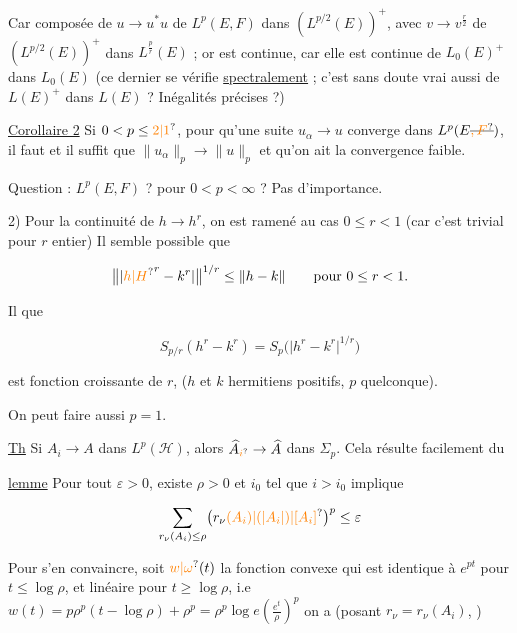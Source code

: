Car composée de $u\to u^*u$ de $L^p(E,F)$ dans $(L^{p/2}(E))^+$, avec $v\to v^{\frac r2}$ de $(L^{p/2}(E))^+$ dans $L^{\frac pr}(E)$ ; or   est continue, car elle est continue de $L_0(E)^+$ dans $L_0(E)$ (ce dernier  se vérifie \uline{spectralement} ; c'est sans doute vrai aussi de $L(E)^+$ dans $L(E)$ ? Inégalités précises ?)

\uline{Corollaire 2} Si $0<p\leq\unsure{2|1}$, pour qu'une suite  $u_\alpha\to u$ converge dans $L^p(E\deleted{\unsure{,F}})$, il faut et il suffit que $\|u_\alpha\|_p\to\|u\|_p$ et qu'on ait la convergence faible.

Question :    $L^p(E,F)$ ? pour $0<p<\infty$ ? Pas d'importance.

2) Pour la continuité de $h\to h^r$, on est ramené au cas $0\leq r<1$ (car c'est trivial pour $r$ entier) Il semble possible que

\[
\bigl\|\lvert {\unsure{h|H}}^r-k^r\rvert\bigr\|^{1/r}\leq\|h-k\|\qquad\text{pour }0\leq r<1.
\]

Il  que

\[
S_{p/r}(h^r-k^r)=S_p\bigl(\lvert h^r-k^r\rvert^{1/r}\bigr)
\]

est fonction croissante de $r$, ($h$ et $k$ hermitiens positifs, $p$ quelconque).

On peut faire aussi $p=1$.

\uline{Th} Si $A_i\to A$ dans $L^p(\mathscr H)$, alors $\widehat A_{\unsure{i}}\to\widehat A$ dans $\Sigma_p$. Cela résulte facilement du

\uline{lemme} Pour tout $\varepsilon>0$, existe $\rho>0$ et $i_0$ tel que $i>i_0$ implique

\[
\sum_{r_\nu(A_i)\leq\rho}\bigl(r_\nu\unsure{(A_i)|(\lvert A_i\rvert)|[A_i]}\bigr)^p\leq\varepsilon
\]

Pour s'en convaincre, soit $\unsure{w|\omega}(t)$ la fonction convexe qui est identique à $e^{pt}$ pour $t\leq\log\rho$, et linéaire pour $t\geq\log\rho$, i.e $w(t)=p\rho^p(t-\log\rho)+\rho^p=\rho^p\log e\left(\frac{e^t}{\rho}\right)^p$ on a (posant $r_\nu=r_\nu(A_i)$, )

